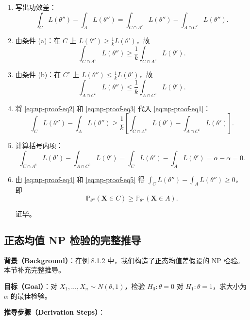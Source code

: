 \begin{enumerate}
\item 写出功效差：
\[
\int_C L(\theta'') - \int_A L(\theta'') = \int_{C \cap A^c} L(\theta'') - \int_{A \cap C^c} L(\theta'').
\label{eq:np-proof-eq1}
\]

\item 由条件 (a)：在 $C$ 上 $L(\theta'') \geq \frac{1}{k}L(\theta')$，故
\[
\int_{C \cap A^c} L(\theta'') \geq \frac{1}{k} \int_{C \cap A^c} L(\theta').
\label{eq:np-proof-eq2}
\]

\item 由条件 (b)：在 $C^c$ 上 $L(\theta'') \leq \frac{1}{k}L(\theta')$，故
\[
\int_{A \cap C^c} L(\theta'') \leq \frac{1}{k} \int_{A \cap C^c} L(\theta').
\label{eq:np-proof-eq3}
\]

\item 将 \cref{eq:np-proof-eq2} 和 \cref{eq:np-proof-eq3} 代入 \cref{eq:np-proof-eq1}：
\[
\int_C L(\theta'') - \int_A L(\theta'') \geq \frac{1}{k}\left[\int_{C \cap A^c} L(\theta') - \int_{A \cap C^c} L(\theta')\right].
\label{eq:np-proof-eq4}
\]

\item 计算括号内项：
\[
\int_{C \cap A^c} L(\theta') - \int_{A \cap C^c} L(\theta') = \int_C L(\theta') - \int_A L(\theta') = \alpha - \alpha = 0.
\label{eq:np-proof-eq5}
\]

\item 由 \cref{eq:np-proof-eq4} 和 \cref{eq:np-proof-eq5} 得 $\int_C L(\theta'') - \int_A L(\theta'') \geq 0$，即
\[
\mathbb{P}_{\theta''}(\mathbf{X} \in C) \geq \mathbb{P}_{\theta''}(\mathbf{X} \in A).
\]

证毕。
\end{enumerate}

\subsection{正态均值 NP 检验的完整推导}\label{sec:normal-np-derivation}

\textbf{背景（Background）}：在例 8.1.2 中，我们构造了正态均值差假设的 NP 检验。本节补充完整推导。

\textbf{目标（Goal）}：对 $X_1, \ldots, X_n \sim N(\theta, 1)$，检验 $H_0: \theta = 0$ 对 $H_1: \theta = 1$，求大小为 $\alpha$ 的最佳检验。

\textbf{推导步骤（Derivation Steps）}：

